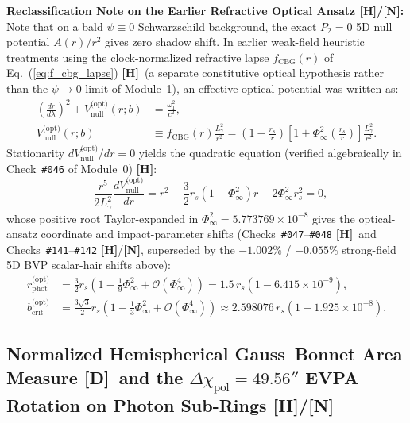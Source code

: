 \documentclass[11pt,a4paper]{article}
\newcommand{\catD}{\textbf{\textcolor{blue!75!black}{[D]}}}
\newcommand{\catH}{\textbf{\textcolor{orange!85!black}{[H]}}}
\newcommand{\catN}{\textbf{\textcolor{teal!75!black}{[N]}}}
\theoremstyle{plain}
\theoremstyle{definition}
\theoremstyle{remark}
\numberwithin{equation}{section}
\begin{document}
\medskip
\noindent\textbf{Reclassification Note on the Earlier Refractive Optical Ansatz \catH/\catN:} Note that on a bald $\psi \equiv 0$ Schwarzschild background, the exact $P_2 = 0$ 5D null potential $A(r)/r^2$ gives zero shadow shift. In earlier weak-field heuristic treatments using the clock-normalized refractive lapse $f_{\text{CBG}}(r)$ of Eq.~(\ref{eq:f_cbg_lapse}) \catH\ (a separate constitutive optical hypothesis rather than the $\psi \to 0$ limit of Module~1), an effective optical potential was written as:
\begin{align}
\left(\frac{dr}{d\lambda}\right)^2 + V_{\text{null}}^{\text{(opt)}}(r; b) &= \frac{\omega_1^2}{c^2}, \nonumber \\[3pt]
V_{\text{null}}^{\text{(opt)}}(r; b) &\equiv f_{\text{CBG}}(r) \frac{L_\gamma^2}{r^2} = \left(1 - \frac{r_s}{r}\right) \left[ 1 + \Phi_{\infty}^2 \left(\frac{r_s}{r}\right) \right] \frac{L_\gamma^2}{r^2}.
\label{eq:null_radial_geodesic}
\end{align}
Stationarity $d V_{\text{null}}^{\text{(opt)}} / dr = 0$ yields the quadratic equation (verified algebraically in Check~\texttt{\#046} of Module~0) \catH:
\begin{equation}
-\frac{r^5}{2 L_\gamma^2}\frac{d V_{\text{null}}^{\text{(opt)}}}{dr} = r^2 - \frac{3}{2} r_s \left(1 - \Phi_{\infty}^2\right) r - 2 \Phi_{\infty}^2 r_s^2 = 0,
\label{eq:photon_sphere_quadratic}
\end{equation}
whose positive root Taylor-expanded in $\Phi_{\infty}^2 = 5.773769 \times 10^{-8}$ gives the optical-ansatz coordinate and impact-parameter shifts (Checks~\texttt{\#047}--\texttt{\#048} \catH\ and Checks~\texttt{\#141}--\texttt{\#142} \catH/\catN, superseded by the $-1.002\%$ / $-0.055\%$ strong-field 5D BVP scalar-hair shifts above):
\begin{align}
r_{\text{phot}}^{\text{(opt)}} &= \frac{3}{2} r_s \left( 1 - \frac{1}{9}\Phi_{\infty}^2 + \mathcal{O}\left(\Phi_{\infty}^4\right) \right) = 1.5\,r_s \left( 1 - 6.415 \times 10^{-9} \right), \label{eq:r_phot_cbg_exact} \\[4pt]
b_{\text{crit}}^{\text{(opt)}} &= \frac{3\sqrt{3}}{2} r_s \left( 1 - \frac{1}{3}\Phi_{\infty}^2 + \mathcal{O}\left(\Phi_{\infty}^4\right) \right) \approx 2.598076\,r_s \left( 1 - 1.925 \times 10^{-8} \right).
\label{eq:b_crit_cbg_exact}
\end{align}

\subsection{\texorpdfstring{Normalized Hemispherical Gauss--Bonnet Area Measure \catD\ and the $\Delta\chi_{\text{pol}} = 49.56''$ EVPA Rotation on Photon Sub-Rings \catH/\catN}{Normalized Hemispherical Gauss-Bonnet Area Measure and the 49.56'' EVPA Rotation on Photon Sub-Rings}}
\end{document}
